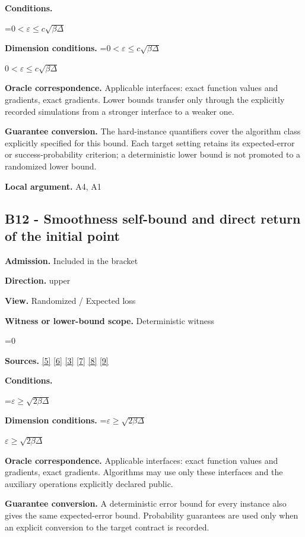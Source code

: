\documentclass[10pt,a4paper]{article}
\newcommand{\AtlasMath}[1]{\par\begingroup\centering\setbox0=\hbox{$\displaystyle #1$}\ifdim\wd0>1.4\linewidth\typeout{ATLAS WIDE FORMULA: \the\wd0}\fi\ifdim\wd0>\linewidth\resizebox{\linewidth}{!}{\box0}\else\box0\fi\par\endgroup}
\newcommand{\AtlasInlineMath}[1]{\begingroup\setbox0=\hbox{$#1$}\ifdim\wd0>.4\linewidth\endgroup\AtlasMath{#1}\else\endgroup$#1$\fi}
\begin{document}
\textbf{Conditions.} 
\AtlasMath{0<\varepsilon\le c\sqrt{\beta\Delta}}


\textbf{Dimension conditions.} \AtlasInlineMath{0<\varepsilon\le c\sqrt{\beta\Delta}}

\textbf{Oracle correspondence.} Applicable interfaces: exact function values and gradients, exact gradients. Lower bounds transfer only through the explicitly recorded simulations from a stronger interface to a weaker one.

\textbf{Guarantee conversion.} The hard-instance quantifiers cover the algorithm class explicitly specified for this bound. Each target setting retains its expected-error or success-probability criterion; a deterministic lower bound is not promoted to a randomized lower bound.

\textbf{Local argument.} A4, A1

\subsection{B12 - Smoothness self-bound and direct return of the initial point}
\textbf{Admission.} Included in the bracket

\textbf{Direction.} upper

\textbf{View.} Randomized / Expected loss

\textbf{Witness or lower-bound scope.} Deterministic witness

\AtlasMath{0}
\textbf{Sources.} \href{https://arxiv.org/pdf/2101.09740v2}{[5]} \href{https://arxiv.org/pdf/2609.33360v2}{[6]} \href{https://arxiv.org/pdf/2609.10874}{[3]} \href{https://arxiv.org/pdf/1405.4980}{[7]} \href{https://www2.isye.gatech.edu/~nemirovs/MOR_AccuracyCertificates.pdf}{[8]} \href{https://arxiv.org/pdf/2609.20701}{[9]}

\textbf{Conditions.} 
\AtlasMath{\varepsilon\ge\sqrt{2\beta\Delta}}


\textbf{Dimension conditions.} \AtlasInlineMath{\varepsilon\ge\sqrt{2\beta\Delta}}

\textbf{Oracle correspondence.} Applicable interfaces: exact function values and gradients, exact gradients. Algorithms may use only these interfaces and the auxiliary operations explicitly declared public.

\textbf{Guarantee conversion.} A deterministic error bound for every instance also gives the same expected-error bound. Probability guarantees are used only when an explicit conversion to the target contract is recorded.
\end{document}
